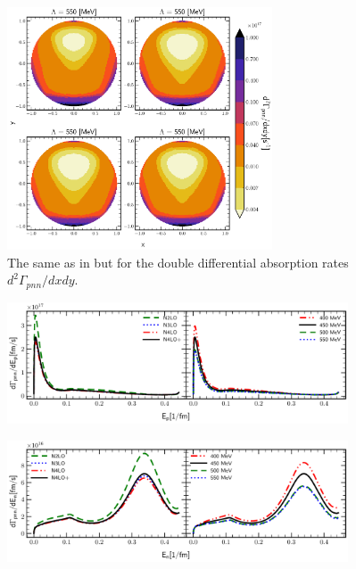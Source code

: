     \begin{figure}[h]
        \begin{center}
        \includegraphics[width=0.7\textwidth]{PlotData/PION/Dalitz_maps/figures/Dalitz_map_pnn_xy_orders.pdf}
        \end{center}
        \caption{The same as in  but for the double differential absorption rates
        $d^2 \Gamma_{pnn}/dxdy$.}
        \label{pion_map_xy_order}
    \end{figure}

    \begin{figure}[h]
        \begin{center}
        \includegraphics[width=0.9\textwidth]{PlotData/PION/Dalitz_maps/figures/3HE_dGdEp.pdf}
        \end{center}
        \caption{}
        \label{pion_GdEp}
    \end{figure}

    \begin{figure}[h]
        \begin{center}
        \includegraphics[width=0.9\textwidth]{PlotData/PION/Dalitz_maps/figures/3HE_dGdEn.pdf}
        \end{center}
        \caption{}
        \label{pion_dGdEn}
    \end{figure}

